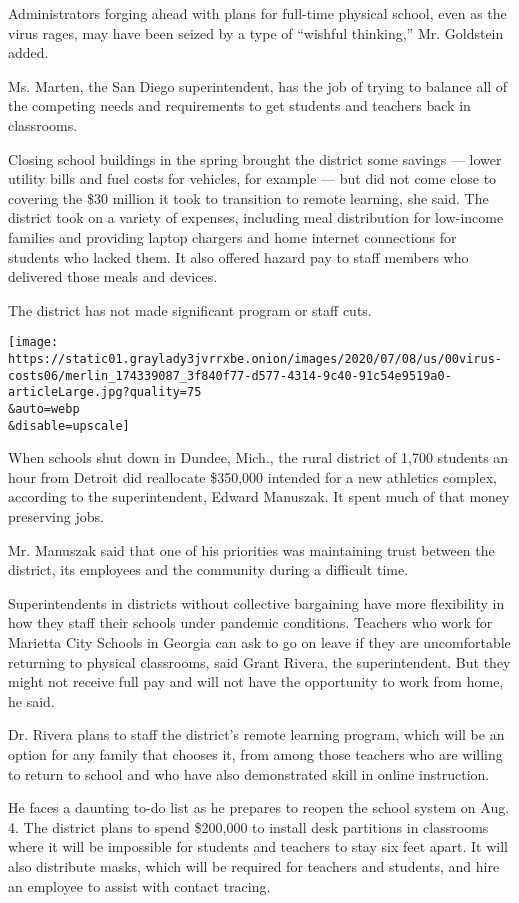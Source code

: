 Administrators forging ahead with plans for full-time physical school,
even as the virus rages, may have been seized by a type of ``wishful
thinking,'' Mr. Goldstein added.

Ms. Marten, the San Diego superintendent, has the job of trying to
balance all of the competing needs and requirements to get students and
teachers back in classrooms.

Closing school buildings in the spring brought the district some savings
--- lower utility bills and fuel costs for vehicles, for example --- but
did not come close to covering the \$30 million it took to transition to
remote learning, she said. The district took on a variety of expenses,
including meal distribution for low-income families and providing laptop
chargers and home internet connections for students who lacked them. It
also offered hazard pay to staff members who delivered those meals and
devices.

The district has not made significant program or staff cuts.

\texttt{[image: https://static01.graylady3jvrrxbe.onion/images/2020/07/08/us/00virus-costs06/merlin\_174339087\_3f840f77-d577-4314-9c40-91c54e9519a0-articleLarge.jpg?quality=75\\\&auto=webp\\\&disable=upscale]}

When schools shut down in Dundee, Mich., the rural district of 1,700
students an hour from Detroit did reallocate \$350,000 intended for a
new athletics complex, according to the superintendent, Edward Manuszak.
It spent much of that money preserving jobs.

Mr. Manuszak said that one of his priorities was maintaining trust
between the district, its employees and the community during a difficult
time.

Superintendents in districts without collective bargaining have more
flexibility in how they staff their schools under pandemic conditions.
Teachers who work for Marietta City Schools in Georgia can ask to go on
leave if they are uncomfortable returning to physical classrooms, said
Grant Rivera, the superintendent. But they might not receive full pay
and will not have the opportunity to work from home, he said.

Dr. Rivera plans to staff the district's remote learning program, which
will be an option for any family that chooses it, from among those
teachers who are willing to return to school and who have also
demonstrated skill in online instruction.

He faces a daunting to-do list as he prepares to reopen the school
system on Aug. 4. The district plans to spend \$200,000 to install desk
partitions in classrooms where it will be impossible for students and
teachers to stay six feet apart. It will also distribute masks, which
will be required for teachers and students, and hire an employee to
assist with contact tracing.

